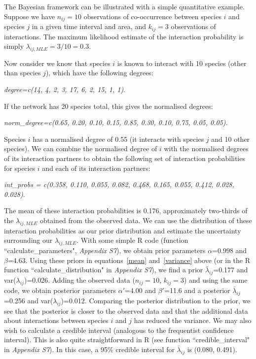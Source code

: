 \documentclass[12pt]{article}
\begin{document}
      The Bayesian framework can be illustrated with a simple quantitative example. Suppose we have $n_{ij}=10$ observations of co-occurrence between species $i$ and species $j$ in a given time interval and area, and $k_{ij}=3$ observations of interactions. The maximum likelihood estimate of the interaction probability is simply $\lambda_{ij,MLE} = 3/10 = 0.3$. 
      

      Now consider we know that species $i$ is known to interact with 10 species (other than species $j$), which have the following degrees:

        \vspace{12pt}
        \noindent\emph{
          degree=c(14, 4, 2, 3, 17, 6, 2, 15, 1, 1)}.
          \vspace{12pt}

        If the network has 20 species total, this gives the normalised degrees:

        \vspace{12pt}
        \noindent\emph{
          norm\_degree=c(0.65, 0.20, 0.10, 0.15, 0.85, 0.30, 0.10, 0.75, 0.05, 0.05)}.
          \vspace{12pt}

        Species $i$ has a normalised degree of 0.55 (it interacts with species $j$ and 10 other species). We can combine the normalised degree of $i$ with the normalised degrees of its interaction partners to obtain the following set of interaction probabilities for species $i$ and each of its interaction partners:

        \vspace{12pt}
        \noindent\emph{
           int\_probs = c(0.358, 0.110, 0.055, 0.082, 0.468, 0.165, 0.055, 0.412, 0.028, 0.028)}.
          \vspace{12pt}

        The mean of these interaction probabilities is 0.176, approximately two-thirds of the $\lambda_{ij,MLE}$ obtained from the observed data. We can use the distribution of these interaction probabilities as our prior distribution and estimate the uncertainty surrounding our $\lambda_{ij,MLE}$. With some simple R code (function ``calculate\_parameters", \emph{Appendix S7}), we obtain prior parameters $\alpha$=0.998 and $\beta$=4.63. Using these priors in equations~\ref{mean} and~\ref{variance} above (or in the R function ``calculate\_distribution" in \emph{Appendix S7}), we find a prior $\bar\lambda_{ij}$=0.177 and var($\lambda_{ij}$)=0.026. Adding the observed data ($n_{ij}=10$, $k_{ij}=3$) and using the same code, we obtain posterior parameters $\alpha'$=4.00 and $\beta'$=11.6 and a posterior $\bar\lambda_{ij}$=0.256 and var($\lambda_{ij}$)=0.012. Comparing the posterior distribution to the prior, we see that the posterior is closer to the observed data and that the additional data about interactions between species $i$ and $j$ has reduced the variance. We may also wish to calculate a credible interval (analogous to the frequentist confidence interval). This is also quite straightforward in R (see function ``credible\_interval" in \emph{Appendix S7}). In this case, a 95\% credible interval for $\bar\lambda_{ij}$ is (0.080, 0.491).
\end{document}
